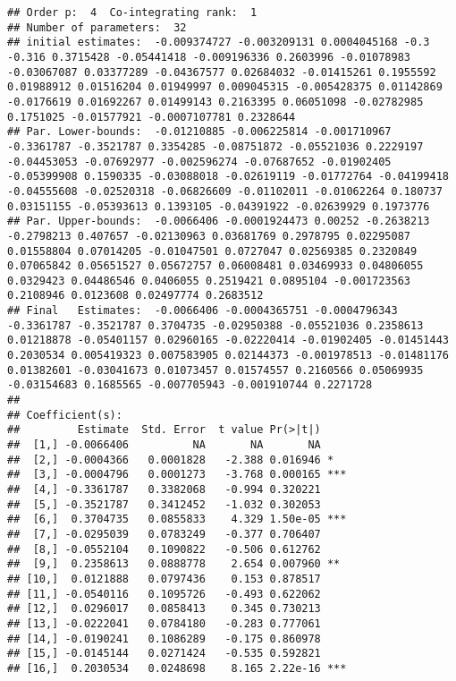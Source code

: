 \documentclass[]{article}
\begin{document}
\begin{verbatim}
## Order p:  4  Co-integrating rank:  1 
## Number of parameters:  32 
## initial estimates:  -0.009374727 -0.003209131 0.0004045168 -0.3 -0.316 0.3715428 -0.05441418 -0.009196336 0.2603996 -0.01078983 -0.03067087 0.03377289 -0.04367577 0.02684032 -0.01415261 0.1955592 0.01988912 0.01516204 0.01949997 0.009045315 -0.005428375 0.01142869 -0.0176619 0.01692267 0.01499143 0.2163395 0.06051098 -0.02782985 0.1751025 -0.01577921 -0.0007107781 0.2328644 
## Par. Lower-bounds:  -0.01210885 -0.006225814 -0.001710967 -0.3361787 -0.3521787 0.3354285 -0.08751872 -0.05521036 0.2229197 -0.04453053 -0.07692977 -0.002596274 -0.07687652 -0.01902405 -0.05399908 0.1590335 -0.03088018 -0.02619119 -0.01772764 -0.04199418 -0.04555608 -0.02520318 -0.06826609 -0.01102011 -0.01062264 0.180737 0.03151155 -0.05393613 0.1393105 -0.04391922 -0.02639929 0.1973776 
## Par. Upper-bounds:  -0.0066406 -0.0001924473 0.00252 -0.2638213 -0.2798213 0.407657 -0.02130963 0.03681769 0.2978795 0.02295087 0.01558804 0.07014205 -0.01047501 0.0727047 0.02569385 0.2320849 0.07065842 0.05651527 0.05672757 0.06008481 0.03469933 0.04806055 0.0329423 0.04486546 0.0406055 0.2519421 0.0895104 -0.001723563 0.2108946 0.0123608 0.02497774 0.2683512 
## Final   Estimates:  -0.0066406 -0.0004365751 -0.0004796343 -0.3361787 -0.3521787 0.3704735 -0.02950388 -0.05521036 0.2358613 0.01218878 -0.05401157 0.02960165 -0.02220414 -0.01902405 -0.01451443 0.2030534 0.005419323 0.007583905 0.02144373 -0.001978513 -0.01481176 0.01382601 -0.03041673 0.01073457 0.01574557 0.2160566 0.05069935 -0.03154683 0.1685565 -0.007705943 -0.001910744 0.2271728 
## 
## Coefficient(s):
##         Estimate  Std. Error  t value Pr(>|t|)    
##  [1,] -0.0066406          NA       NA       NA    
##  [2,] -0.0004366   0.0001828   -2.388 0.016946 *  
##  [3,] -0.0004796   0.0001273   -3.768 0.000165 ***
##  [4,] -0.3361787   0.3382068   -0.994 0.320221    
##  [5,] -0.3521787   0.3412452   -1.032 0.302053    
##  [6,]  0.3704735   0.0855833    4.329 1.50e-05 ***
##  [7,] -0.0295039   0.0783249   -0.377 0.706407    
##  [8,] -0.0552104   0.1090822   -0.506 0.612762    
##  [9,]  0.2358613   0.0888778    2.654 0.007960 ** 
## [10,]  0.0121888   0.0797436    0.153 0.878517    
## [11,] -0.0540116   0.1095726   -0.493 0.622062    
## [12,]  0.0296017   0.0858413    0.345 0.730213    
## [13,] -0.0222041   0.0784180   -0.283 0.777061    
## [14,] -0.0190241   0.1086289   -0.175 0.860978    
## [15,] -0.0145144   0.0271424   -0.535 0.592821    
## [16,]  0.2030534   0.0248698    8.165 2.22e-16 ***

\end{verbatim}
\end{document}
